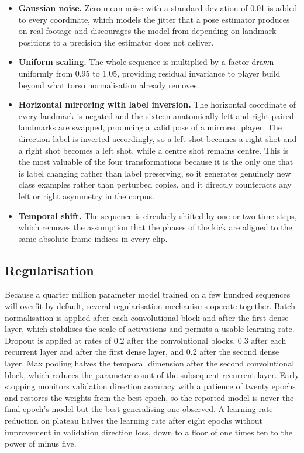\begin{itemize}
    \item \textbf{Gaussian noise.} Zero mean noise with a standard deviation of 0.01 is added to every coordinate, which models the jitter that a pose estimator produces on real footage and discourages the model from depending on landmark positions to a precision the estimator does not deliver.
    \item \textbf{Uniform scaling.} The whole sequence is multiplied by a factor drawn uniformly from 0.95 to 1.05, providing residual invariance to player build beyond what torso normalisation already removes.
    \item \textbf{Horizontal mirroring with label inversion.} The horizontal coordinate of every landmark is negated and the sixteen anatomically left and right paired landmarks are swapped, producing a valid pose of a mirrored player. The direction label is inverted accordingly, so a left shot becomes a right shot and a right shot becomes a left shot, while a centre shot remains centre. This is the most valuable of the four transformations because it is the only one that is label changing rather than label preserving, so it generates genuinely new class examples rather than perturbed copies, and it directly counteracts any left or right asymmetry in the corpus.
    \item \textbf{Temporal shift.} The sequence is circularly shifted by one or two time steps, which removes the assumption that the phases of the kick are aligned to the same absolute frame indices in every clip.
\end{itemize}

\subsection{Regularisation}

Because a quarter million parameter model trained on a few hundred sequences will overfit by default, several regularisation mechanisms operate together. Batch normalisation is applied after each convolutional block and after the first dense layer, which stabilises the scale of activations and permits a usable learning rate. Dropout is applied at rates of 0.2 after the convolutional blocks, 0.3 after each recurrent layer and after the first dense layer, and 0.2 after the second dense layer. Max pooling halves the temporal dimension after the second convolutional block, which reduces the parameter count of the subsequent recurrent layer. Early stopping monitors validation direction accuracy with a patience of twenty epochs and restores the weights from the best epoch, so the reported model is never the final epoch's model but the best generalising one observed. A learning rate reduction on plateau halves the learning rate after eight epochs without improvement in validation direction loss, down to a floor of one times ten to the power of minus five.

